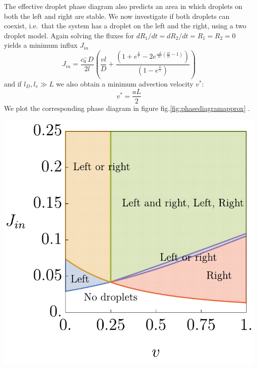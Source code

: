 \documentclass{Dissertate}
\let\origfigure\figure
\let\endorigfigure\endfigure
\renewenvironment{figure}[1][2] {
    \expandafter\origfigure\expandafter[H]
} {
    \endorigfigure
}
\begin{document}
The effective droplet phase diagram also predicts an area in which
droplets on both the left and right are stable. We now investigate if
both droplets can coexist, i.e.~that the system has a droplet on the
left and the right, using a two droplet model. Again solving the fluxes
for \(dR_1/dt=dR_2/dt=R_1=R_2=0\) yields a minimum influx \(J_{in}\) \[
J_{in} = \frac{c_0^-D}{2l}\left(\frac{vl}{D}+\frac{(1+e^{\frac{L}{l}}-2e^{\frac{-L}{2l}(\frac{vl}{D}-1)})}{(1-e^{\frac{L}{l}})}\right)
\] and if \(l_D,l_v\gg L\) we also obtain a minimum advection velocity
\(v^*\): \begin{equation}
v^*=\frac{aL}{2}
\label{eq:minadv}\end{equation} We plot the corresponding phase diagram
in figure fig.\ref{fig:phasediagramapprox} .

\begin{figure}
\hypertarget{fig:phasediagramapprox}{%
\centering
\includegraphics{source/figures/pdf/phaseapprox.pdf}
\caption{Caption.}\label{fig:phasediagramapprox}
}
\end{figure}
\end{document}
